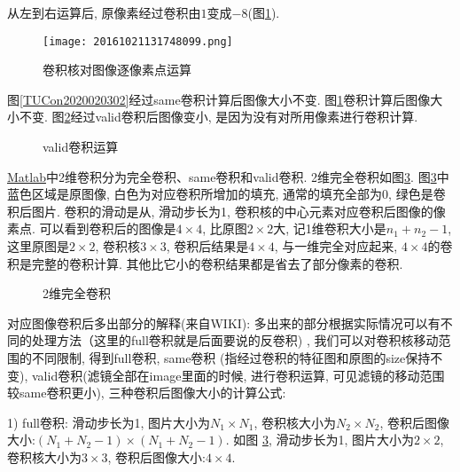 \begin{example}
从左到右运算后, 原像素经过卷积由$1$变成$-8$(图\ref{CNN20161021131748099}).
\begin{figure}[H]
\centering
\texttt{[image: 20161021131748099.png]}
\caption{卷积核对图像逐像素点运算}
\label{CNN20161021131748099}
\end{figure}
\vspace{-0.4cm}
\end{example}

图\ref{TUCon2020020302}经过same卷积计算后图像大小不变. 
图\ref{CNN20161021131748099}卷积计算后图像大小不变. 图\ref{20161021135241205}经过valid卷积后图像变小, 是因为没有对所用像素进行卷积计算.
\begin{figure}[H]
\centering
{}
\caption{valid卷积运算}
\label{20161021135241205}
\end{figure}

\href{https://cn.mathworks.com/help/matlab/ref/conv2.html?requestedDomain=www.mathworks.com}{Matlab}中2维卷积分为完全卷积、same卷积和valid卷积.
2维完全卷积如图\ref{CNN20161021141659634}.
图\ref{CNN20161021141659634}中蓝色区域是原图像, 白色为对应卷积所增加的填充, 通常的填充全部为0, 绿色是卷积后图片.
卷积的滑动是从, 滑动步长为1, 卷积核的中心元素对应卷积后图像的像素点.
可以看到卷积后的图像是$4\times 4$, 比原图$2\times 2$大, 记1维卷积大小是$n_1+n_2-1$, 这里原图是$2\times 2$, 卷积核$3\times 3$, 卷积后结果是$4\times 4$, 与一维完全对应起来,
$4\times 4$的卷积是完整的卷积计算. 其他比它小的卷积结果都是省去了部分像素的卷积.
\begin{figure}[H]
\centering
{}
\caption{2维完全卷积}
\label{CNN20161021141659634}
\end{figure}
对应图像卷积后多出部分的解释(来自WIKI): 多出来的部分根据实际情况可以有不同的处理方法（这里的full卷积就是后面要说的反卷积) ,
我们可以对卷积核移动范围的不同限制, 得到full卷积, same卷积 (指经过卷积的特征图和原图的size保持不变), valid卷积(滤镜全部在image里面的时候, 进行卷积运算, 可见滤镜的移动范围较same卷积更小), 三种卷积后图像大小的计算公式:

1) full卷积: 滑动步长为1, 图片大小为$N_1\times N_1$, 卷积核大小为$N_2\times N_2$, 卷积后图像大小:$(N_1+N_2-1) \times (N_1+N_2-1)$.
如图 \ref{CNN20161021141659634}, 滑动步长为1, 图片大小为$2\times 2$, 卷积核大小为$3\times 3$, 卷积后图像大小:$4\times 4$.

